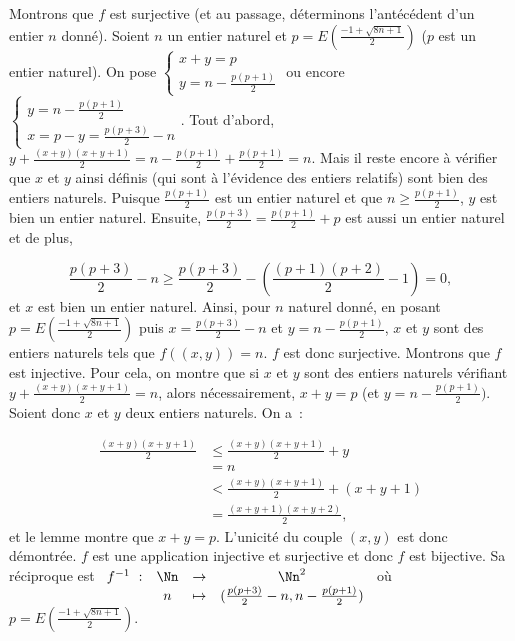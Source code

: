 {{Montrons que $f$ est surjective (et au passage, déterminons l'antécédent d'un entier $n$ donné).
Soient $n$ un entier naturel et $p=E\left(\frac{-1+\sqrt{8n+1}}{2}\right)$ ($p$ est un entier naturel). On pose $\left\{
\begin{array}{l}
x+y=p\\
y=n-\frac{p(p+1)}{2}
\end{array}
\right.$ ou encore $\left\{
\begin{array}{l}
y=n-\frac{p(p+1)}{2}\\
x=p-y=\frac{p(p+3)}{2}-n
\end{array}
\right.$. Tout d'abord, $y+\frac{(x+y)(x+y+1)}{2}=n-\frac{p(p+1)}{2}+\frac{p(p+1)}{2}=n$. Mais il reste encore à
vérifier que $x$ et $y$ ainsi définis (qui sont à l'évidence des entiers relatifs) sont bien des entiers
naturels. Puisque $\frac{p(p+1)}{2}$ est un entier naturel et que $n\geq\frac{p(p+1)}{2}$, $y$ est bien un entier
naturel. Ensuite, $\frac{p(p+3)}{2}=\frac{p(p+1)}{2}+p$ est aussi un entier naturel et de plus,

$$\frac{p(p+3)}{2}-n\geq\frac{p(p+3)}{2}-\left(\frac{(p+1)(p+2)}{2}-1\right)=0,$$
et $x$ est bien un entier naturel. Ainsi, pour $n$ naturel donné, en posant $p= E\left(\frac{-1+\sqrt{8n+1}}{2}\right)$ puis
$x=\frac{p(p+3)}{2}-n$ et $y=n-\frac{p(p+1)}{2}$, $x$ et $y$ sont des entiers naturels tels que $f((x,y))=n$. $f$ est
donc surjective.
Montrons que $f$ est injective.
Pour cela, on montre que si $x$ et $y$ sont des entiers naturels vérifiant
$y+\frac{(x+y)(x+y+1)}{2}=n$, alors nécessairement, $x+y=p$ (et $y=n-\frac{p(p+1)}{2})$.
Soient donc $x$ et $y$ deux entiers naturels. On a~:

\begin{align*}
\frac{(x+y)(x+y+1)}{2} &\leq \frac{(x+y)(x+y+1)}{2}+y \\
&= n \\
&< \frac{(x+y)(x+y+1)}{2}+(x+y+1) \\
&= \frac{(x+y+1)(x+y+2)}{2},
\end{align*}
et le lemme montre que $x+y=p$. L'unicité du couple $(x,y)$ est donc démontrée. $f$ est une application injective et
surjective et donc $f$ est bijective. Sa réciproque est $\begin{array}[t]{cccc}
f^{-1}~:&\Nn&\rightarrow&\Nn^2\\
 &n&\mapsto&(\frac{p(p+3)}{2}-n,n-\frac{p(p+1)}{2})
\end{array}$ où $p=E\left(\frac{-1+\sqrt{8n+1}}{2}\right)$.
}
}
